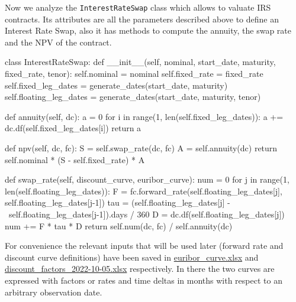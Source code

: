 \begin{finmarkets}
Now we analyze the \texttt{InterestRateSwap} class which allows to valuate IRS contracts. Its attributes are all the parameters described above to define an Interest Rate Swap, also it has methods to compute the annuity, the swap rate and the NPV of the contract. 
\end{finmarkets}

\begin{ipython}
class InterestRateSwap:
    def __init__(self, nominal, start_date, maturity, fixed_rate, tenor):
        self.nominal = nominal
        self.fixed_rate = fixed_rate
        self.fixed_leg_dates = generate_dates(start_date, maturity)
        self.floating_leg_dates = generate_dates(start_date, maturity, tenor)

    def annuity(self, dc):
        a = 0
        for i in range(1, len(self.fixed_leg_dates)):
            a += dc.df(self.fixed_leg_dates[i])
        return a

    def npv(self, dc, fc):
        S = self.swap_rate(dc, fc)
        A = self.annuity(dc)
        return self.nominal * (S - self.fixed_rate) * A

    def swap_rate(self, discount_curve, euribor_curve):
        num = 0
        for j in range(1, len(self.floating_leg_dates)):
            F = fc.forward_rate(self.floating_leg_dates[j], 
                                self.floating_leg_dates[j-1])
            tau = (self.floating_leg_dates[j] - \ 
                   self.floating_leg_dates[j-1]).days / 360
            D = dc.df(self.floating_leg_dates[j])
            num += F * tau * D
        return self.num(dc, fc) / self.annuity(dc)
\end{ipython}

For convenience the relevant inputs that will be used later (forward rate and discount curve definitions) have been saved in \href{https://github.com/matteosan1/finance_course/raw/master/input_files/euribor_curve.xlsx}{euribor\_curve.xlsx} and \href{https://github.com/matteosan1/finance_course/raw/master/input_files/discount_factors_2022-10-05.xlsx}{discount\_factors\_2022-10-05.xlsx} respectively.
In there the two curves are expressed with factors or rates and time deltas in months with respect to an arbitrary observation date.

